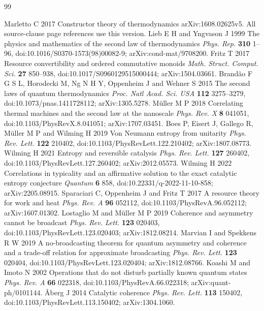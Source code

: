 \begin{thebibliography}{99}
\small\raggedright
{} Marletto C 2017 Constructor theory of thermodynamics arXiv:1608.02625v5. All source-clause page references use this version.
 Lieb E H and Yngvason J 1999 The physics and mathematics of the second law of thermodynamics \textit{Phys. Rep.} \textbf{310} 1--96, doi:10.1016/S0370-1573(98)00082-9; arXiv:cond-mat/9708200.
 Fritz T 2017 Resource convertibility and ordered commutative monoids \textit{Math. Struct. Comput. Sci.} \textbf{27} 850--938, doi:10.1017/S0960129515000444; arXiv:1504.03661.
 Brand\~ao F G S L, Horodecki M, Ng N H Y, Oppenheim J and Wehner S 2015 The second laws of quantum thermodynamics \textit{Proc. Natl Acad. Sci. USA} \textbf{112} 3275--3279, doi:10.1073/pnas.1411728112; arXiv:1305.5278.
 M\"uller M P 2018 Correlating thermal machines and the second law at the nanoscale \textit{Phys. Rev. X} \textbf{8} 041051, doi:10.1103/PhysRevX.8.041051; arXiv:1707.03451.
 Boes P, Eisert J, Gallego R, M\"uller M P and Wilming H 2019 Von Neumann entropy from unitarity \textit{Phys. Rev. Lett.} \textbf{122} 210402, doi:10.1103/PhysRevLett.122.210402; arXiv:1807.08773.
 Wilming H 2021 Entropy and reversible catalysis \textit{Phys. Rev. Lett.} \textbf{127} 260402, doi:10.1103/PhysRevLett.127.260402; arXiv:2012.05573.
 Wilming H 2022 Correlations in typicality and an affirmative solution to the exact catalytic entropy conjecture \textit{Quantum} \textbf{6} 858, doi:10.22331/q-2022-11-10-858; arXiv:2205.08915.
 Sparaciari C, Oppenheim J and Fritz T 2017 A resource theory for work and heat \textit{Phys. Rev. A} \textbf{96} 052112, doi:10.1103/PhysRevA.96.052112; arXiv:1607.01302.
 Lostaglio M and M\"uller M P 2019 Coherence and asymmetry cannot be broadcast \textit{Phys. Rev. Lett.} \textbf{123} 020403, doi:10.1103/PhysRevLett.123.020403; arXiv:1812.08214.
 Marvian I and Spekkens R W 2019 A no-broadcasting theorem for quantum asymmetry and coherence and a trade-off relation for approximate broadcasting \textit{Phys. Rev. Lett.} \textbf{123} 020404, doi:10.1103/PhysRevLett.123.020404; arXiv:1812.08766.
 Koashi M and Imoto N 2002 Operations that do not disturb partially known quantum states \textit{Phys. Rev. A} \textbf{66} 022318, doi:10.1103/PhysRevA.66.022318; arXiv:quant-ph/0101144.
 \AA berg J 2014 Catalytic coherence \textit{Phys. Rev. Lett.} \textbf{113} 150402, doi:10.1103/PhysRevLett.113.150402; arXiv:1304.1060.
\end{thebibliography}
